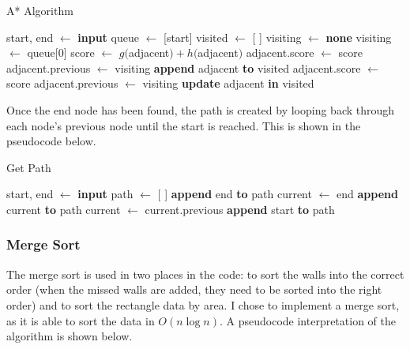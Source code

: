 \documentclass[titlepage]{article}
\begin{document}
\begin{algorithm}
\caption{A* Algorithm}
\begin{algorithmic}[1]
	\State start, end $\gets$ \textbf{input}
  	\State queue $\gets$ [start]
	\State visited $\gets$ [ ]
	\State visiting $\gets$ \textbf{none}
    		\State visiting $\gets$ queue[0]
		        \State score $\gets$ $g($adjacent$) + h($adjacent$)$
				\State adjacent.score $\gets$ score
				\State adjacent.previous $\gets$ visiting
                			\State \textbf{append} adjacent \textbf{to} visited
				\State adjacent.score $\gets$ score
				\State adjacent.previous $\gets$ visiting
                			\State \textbf{update} adjacent \textbf{in} visited
			\EndIf
    		\EndFor
    	\EndWhile
\end{algorithmic}
\end{algorithm}

Once the end node has been found, the path is created by looping back through each node's previous node until the start is reached. This is shown in the pseudocode below. 

\begin{algorithm}
\caption{Get Path}
\begin{algorithmic}[1]
	\State start, end $\gets$ \textbf{input}
	\State path $\gets$ [ ]
	\State \textbf{append} end \textbf{to} path 
	\State current $\gets$ end
		\State \textbf{append} current \textbf{to} path 
		\State current $\gets$ current.previous
	\EndWhile
	\State \textbf{append} start \textbf{to} path 
\end{algorithmic}
\end{algorithm}
		
\subsubsection{Merge Sort}
The merge sort is used in two places in the code: to sort the walls into the correct order (when the missed walls are added, they need to be sorted into the right order) and to sort the rectangle data by area. I chose to implement a merge sort, as it is able to sort the data in $O(n\log n)$. A pseudocode interpretation of the algorithm is shown below.
\end{document}
